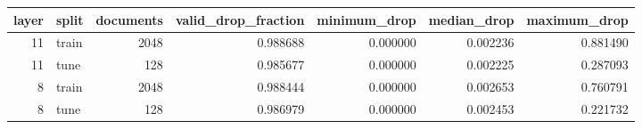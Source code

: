 \begin{tabular}{rlrrrrr}
\toprule
layer & split & documents & valid_drop_fraction & minimum_drop & median_drop & maximum_drop \\
\midrule
11 & train & 2048 & 0.988688 & 0.000000 & 0.002236 & 0.881490 \\
11 & tune & 128 & 0.985677 & 0.000000 & 0.002225 & 0.287093 \\
8 & train & 2048 & 0.988444 & 0.000000 & 0.002653 & 0.760791 \\
8 & tune & 128 & 0.986979 & 0.000000 & 0.002453 & 0.221732 \\
\bottomrule
\end{tabular}
